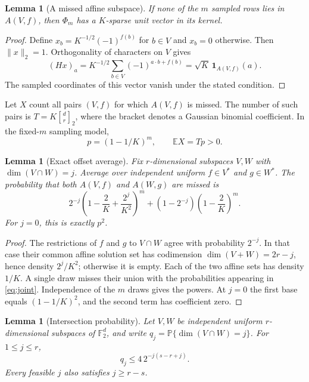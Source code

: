 \documentclass[11pt]{article}
\newtheorem{lemma}[theorem]{Lemma}
\theoremstyle{remark}
\newcommand{\E}{\mathbb E}
\newcommand{\Prob}{\mathbb P}
\newcommand{\F}{\mathbb F}
\newcommand{\1}{\mathbf 1}
\newcommand{\gaussbinom}[2]{\genfrac{[}{]}{0pt}{}{#1}{#2}_{\!2}}
\begin{document}
\begin{lemma}[A missed affine subspace]\label{lem:witness}
If none of the $m$ sampled rows lies in $A(V,f)$, then $\Phi_m$ has a
$K$-sparse unit vector in its kernel.
\end{lemma}

\begin{proof}
Define $x_b=K^{-1/2}(-1)^{f(b)}$ for $b\in V$ and $x_b=0$ otherwise.
Then $\|x\|_2=1$. Orthogonality of characters on $V$ gives
\[
 (Hx)_a=K^{-1/2}\sum_{b\in V}(-1)^{a\cdot b+f(b)}
        =\sqrt K\,\1_{A(V,f)}(a).
\]
The sampled coordinates of this vector vanish under the stated condition.
\end{proof}

Let $X$ count all pairs $(V,f)$ for which $A(V,f)$ is missed. The number
of such pairs is $T=K\gaussbinom dr$, where the bracket denotes a Gaussian
binomial coefficient. In the fixed-$m$ sampling model,
\begin{equation}\label{eq:firstmoment}
 p=(1-1/K)^m,\qquad \E X=Tp>0.
\end{equation}

\begin{lemma}[Exact offset average]\label{lem:joint}
Fix $r$-dimensional subspaces $V,W$ with $\dim(V\cap W)=j$.
Average over independent uniform $f\in V^*$ and $g\in W^*$.
The probability that both $A(V,f)$ and $A(W,g)$ are missed is
\begin{equation}\label{eq:joint}
 2^{-j}\left(1-\frac2K+\frac{2^j}{K^2}\right)^m
 +(1-2^{-j})\left(1-\frac2K\right)^m.
\end{equation}
For $j=0$, this is exactly $p^2$.
\end{lemma}

\begin{proof}
The restrictions of $f$ and $g$ to $V\cap W$ agree with probability
$2^{-j}$. In that case their common affine solution set has codimension
$\dim(V+W)=2r-j$, hence density $2^j/K^2$; otherwise it is empty.
Each of the two affine sets has density $1/K$. A single draw misses
their union with the probabilities appearing in \eqref{eq:joint}.
Independence of the $m$ draws gives the powers. At $j=0$ the first base
equals $(1-1/K)^2$, and the second term has coefficient zero.
\end{proof}

\begin{lemma}[Intersection probability]\label{lem:intersection}
Let $V,W$ be independent uniform $r$-dimensional subspaces of $\F_2^d$,
and write $q_j=\Prob\{\dim(V\cap W)=j\}$. For $1\leq j\leq r$,
\begin{equation}\label{eq:qbound}
 q_j\leq4\,2^{-j(s-r+j)}.
\end{equation}
Every feasible $j$ also satisfies $j\geq r-s$.
\end{lemma}
\end{document}
